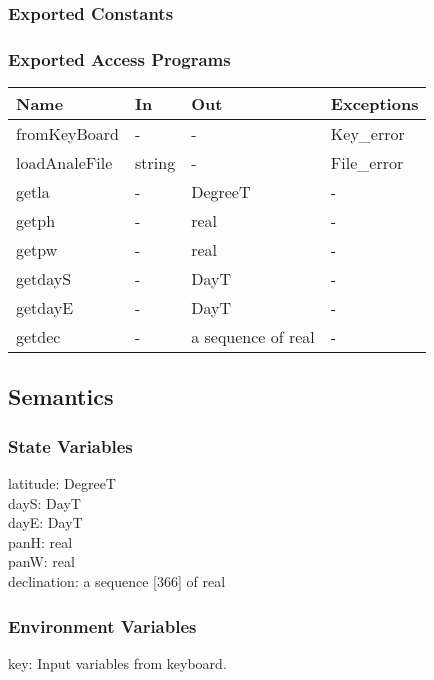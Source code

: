 \documentclass[12pt, titlepage]{article}
\begin{document}
\subsubsection{Exported Constants}


\subsubsection{Exported Access Programs}

\begin{center}
\begin{tabular}{p{4cm} p{2cm} p{4cm} p{2cm}}
\hline
\textbf{Name} & \textbf{In} & \textbf{Out} & \textbf{Exceptions} \\
\hline 
fromKeyBoard & - & - & Key\_error \\
loadAnaleFile & string & - & File\_error \\
getla & - & DegreeT & - \\
getph & - & real & - \\
getpw & - & real & - \\
getdayS & - & DayT & - \\
getdayE & - & DayT & - \\
getdec & - & a sequence of real & - \\


\hline
\end{tabular}
\end{center}


\subsection{Semantics}

\subsubsection{State Variables}
latitude: DegreeT\\
dayS: DayT \\
dayE: DayT\\
panH: real\\
panW: real\\
declination: a sequence [366] of real


\subsubsection{Environment Variables}
key: Input variables from keyboard.
\end{document}
